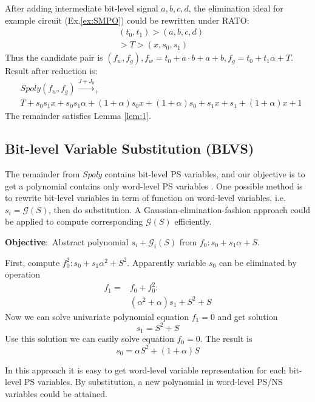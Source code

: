 \begin{Example}
After adding intermediate bit-level signal $a,b,c,d$, the elimination ideal for example circuit (Ex.\ref{ex:SMPO}) 
could be rewritten under RATO:
\begin{align}
&(t_0,t_1)>(a,b,c,d)\nonumber\\&>T>(x,s_0,s_1)\nonumber
\end{align}
Thus the candidate pair is
$(f_w,f_g), f_w = t_0+a\cdot b+a+b, f_g =t_0+t_1\alpha + T$.
Result after reduction is:
\begin{align}
&Spoly(f_w,f_g) \xrightarrow{J+J_0}_{+}\nonumber\\
&T + s_0 s_1 x+s_0 s_1 \alpha+(1+\alpha)s_0 x+(1+\alpha) s_0+s_1 x+s_1+(1+\alpha) x+1\nonumber
\end{align}
The remainder satisfies Lemma \ref{lem:1}.
\end{Example}

\subsection{Bit-level Variable Substitution (BLVS)}
\label{sec:blvs}
The remainder from \emph{Spoly} contains bit-level PS variables, and our objective is to get a polynomial contains only word-level PS variables
. One possible method is to rewrite bit-level variables in term of function on word-level
variables, i.e. $s_i = \mathcal{G}(S)$, then do substitution. A Gaussian-elimination-fashion approach could be applied to
compute corresponding $\mathcal{G}(S)$ efficiently.

\begin{Example}
{\bf Objective}:\ Abstract polynomial $s_i + \mathcal{G}_i(S)$ from $f_0: s_0+s_1\alpha+S$.

First, compute $f_0^2: s_0+s_1\alpha^2+S^2$. Apparently variable $s_0$ can be
eliminated by operation 
\begin{align}
f_1 =& f_0 + f_0^2: \nonumber\\
&(\alpha^2+\alpha)s_1+S^2+S\nonumber
\end{align}
Now we can solve univariate polynomial equation $f_1 = 0$ and get solution
$$s_1 = S^2 + S$$
Use this solution we can easily solve equation $f_0 = 0$. The result is
$$s_0 = \alpha S^2+(1+\alpha)S$$
\end{Example}
In this approach it is easy to get word-level variable representation for each bit-level PS variables. By substitution, a new polynomial in word-level PS/NS variables
could be attained.

